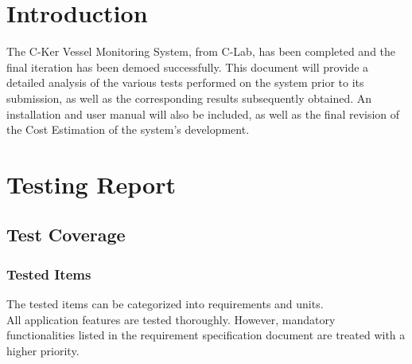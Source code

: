\documentclass[12pt]{article}
\begin{document}
\setcounter{secnumdepth}{3}
\tableofcontents
\clearpage
\listoffigures
\listoftables

\clearpage

\pagestyle{plain}
\doublespacing




\section{Introduction}
\par
The C-Ker Vessel Monitoring System, from C-Lab, has been completed and the final iteration has been demoed successfully. This document will provide a detailed analysis of the various tests performed on the system prior to its submission, as well as the corresponding results subsequently obtained. An installation and user manual will also be included, as well as the final revision of the Cost Estimation of the system’s development.







\section{Testing Report}

\subsection{Test Coverage}
\subsubsection{Tested Items}
The tested items can be categorized into requirements and units.\\


\vspace*{0.2in}
All application features are tested thoroughly. However, mandatory functionalities listed in the requirement specification document are treated with a higher priority.
\end{document}
